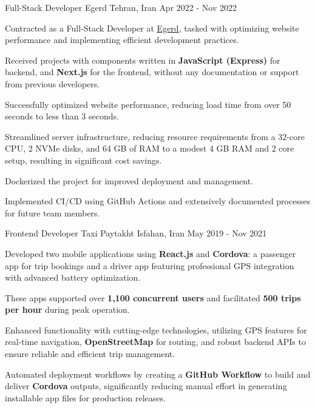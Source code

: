 \begin{cventries}
  \cventry
    {Full-Stack Developer} %
    {Egerd} %
    {Tehran, Iran} %
    {Apr 2022 - Nov 2022} %
    {
      \begin{cvitems} %
        \item {Contracted as a Full-Stack Developer at \href{https://egerd.com/}{\underline{Egerd}}, tasked with optimizing website performance and implementing efficient development practices.}
        \item {Received projects with components written in \textbf{JavaScript (Express)} for backend, and \textbf{Next.js} for the frontend, without any documentation or support from previous developers.}
        \item {Successfully optimized website performance, reducing load time from over 50 seconds to less than 3 seconds.}
        \item {Streamlined server infrastructure, reducing resource requirements from a 32-core CPU, 2 NVMe disks, and 64 GB of RAM to a modest 4 GB RAM and 2 core setup, resulting in significant cost savings.}
        \item {Dockerized the project for improved deployment and management.}
        \item {Implemented CI/CD using GitHub Actions and extensively documented processes for future team members.}
      \end{cvitems}
    }

  \cventry
    {Frontend Developer} %
    {Taxi Paytakht} %
    {Isfahan, Iran} %
    {May 2019  - Nov 2021} %
    {
      \begin{cvitems}
        \item {Developed two mobile applications using \textbf{React.js} and \textbf{Cordova}: a passenger app for trip bookings and a driver app featuring professional GPS integration with advanced battery optimization.}
        \item {These apps supported over \textbf{1,100 concurrent users} and facilitated \textbf{500 trips per hour} during peak operation.}
        \item {Enhanced functionality with cutting-edge technologies, utilizing GPS features for real-time navigation, \textbf{OpenStreetMap} for routing, and robust backend APIs to ensure reliable and efficient trip management.}
        \item {Automated deployment workflows by creating a \textbf{GitHub Workflow} to build and deliver \textbf{Cordova} outputs, significantly reducing manual effort in generating installable app files for production releases.}
      \end{cvitems}
    }
  

\end{cventries}
